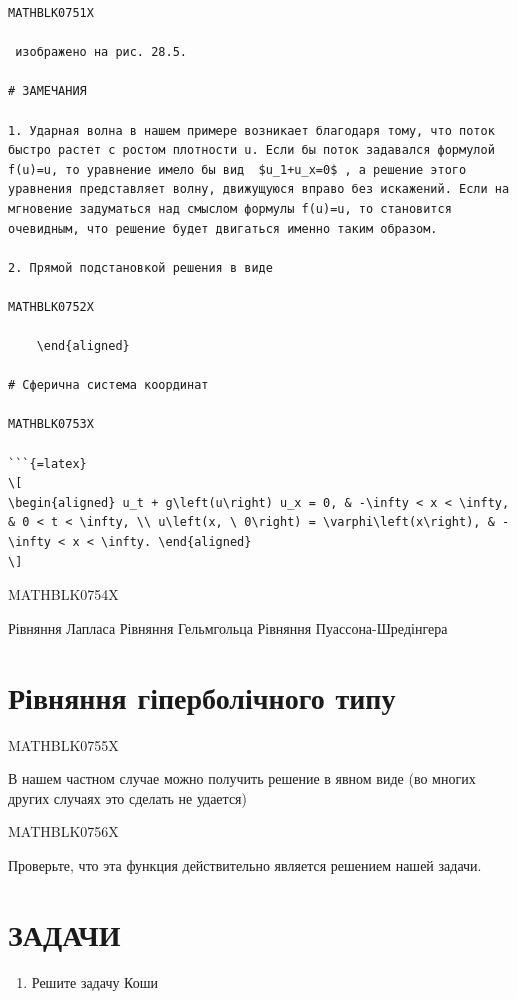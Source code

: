 \documentclass[
]{article}
\providecommand{\tightlist}{%
  \setlength{\itemsep}{0pt}\setlength{\parskip}{0pt}}
\begin{document}
\begin{verbatim}
MATHBLK0751X

 изображено на рис. 28.5.

# ЗАМЕЧАНИЯ

1. Ударная волна в нашем примере возникает благодаря тому, что поток быстро растет с ростом плотности u. Если бы поток задавался формулой f(u)=u, то уравнение имело бы вид  $u_1+u_x=0$ , а решение этого уравнения представляет волну, движущуюся вправо без искажений. Если на мгновение задуматься над смыслом формулы f(u)=u, то становится очевидным, что решение будет двигаться именно таким образом.

2. Прямой подстановкой решения в виде

MATHBLK0752X

    \end{aligned}

# Сферична система координат

MATHBLK0753X

```{=latex}
\[
\begin{aligned} u_t + g\left(u\right) u_x = 0, & -\infty < x < \infty, & 0 < t < \infty, \\ u\left(x, \ 0\right) = \varphi\left(x\right), & -\infty < x < \infty. \end{aligned}
\]
\end{verbatim}

MATHBLK0754X

Рівняння Лапласа Рівняння Гельмгольца Рівняння Пуассона-Шредінгера

\section{Рівняння гіперболічного
типу}\label{ux440ux456ux432ux43dux44fux43dux43dux44f-ux433ux456ux43fux435ux440ux431ux43eux43bux456ux447ux43dux43eux433ux43e-ux442ux438ux43fux443}

MATHBLK0755X

В нашем частном случае можно получить решение в явном виде (во многих
других случаях это сделать не удается)

MATHBLK0756X

Проверьте, что эта функция действительно является решением нашей задачи.

\section{\texorpdfstring{\textbf{ЗАДАЧИ}}{ЗАДАЧИ}}\label{ux437ux430ux434ux430ux447ux438-3}

\begin{enumerate}
\def\labelenumi{\arabic{enumi}.}
\tightlist
\item
  Решите задачу Коши
\end{enumerate}
\end{document}
